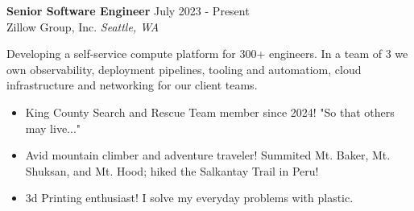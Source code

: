 \begin{mdframed}[linewidth=2,linecolor=blue, innertopmargin=1em, innerbottommargin=1em, topline=false, rightline=false, bottomline=false]
\textbf{Senior Software Engineer} \hfill July 2023 - Present\\
Zillow Group, Inc. \hfill \textit{Seattle, WA}

Developing a self-service compute platform for 300+ engineers. In a team of 3 we own observability, deployment pipelines, tooling and automatiom, cloud infrastructure and networking for our client teams. 
\begin{itemize}
    \item King County Search and Rescue Team member since 2024! "So that others may live..." 
    \item Avid mountain climber and adventure traveler! Summited Mt. Baker, Mt. Shuksan, and Mt. Hood; hiked the Salkantay Trail in Peru!
    \item 3d Printing enthusiast! I solve my everyday problems with plastic.
\end{itemize}
\end{mdframed}
